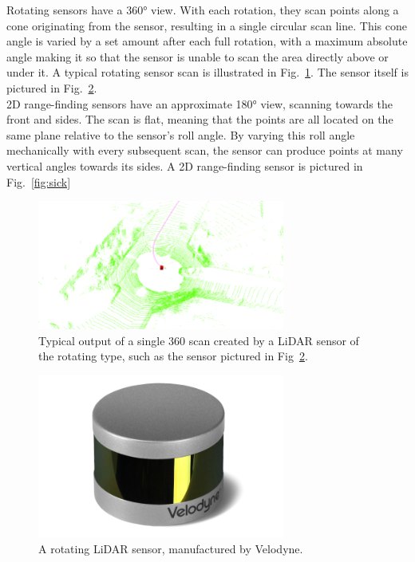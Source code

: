 Rotating sensors have a 360° view. With each rotation, they scan points along a cone originating from the sensor, resulting in a single circular scan line. This cone angle is varied by a set amount after each full rotation, with a maximum absolute angle making it so that the sensor is unable to scan the area directly above or under it. A typical rotating sensor scan is illustrated in Fig.~\ref{fig:velodyne-scan}. The sensor itself is pictured in Fig.~\ref{fig:velodyne}.\\

2D range-finding sensors have an approximate 180° view, scanning towards the front and sides. The scan is flat, meaning that the points are all located on the same plane relative to the sensor’s roll angle. By varying this roll angle mechanically with every subsequent scan, the sensor can produce points at many vertical angles towards its sides. A 2D range-finding sensor is pictured in Fig.~\ref{fig:sick}\\


\begin{figure}
  \centering
  \includegraphics[width=3.2in]{images/1_velodyne_scan.png}
  \caption{Typical output of a single 360 \degree scan created by a LiDAR sensor of the rotating type, such as the sensor pictured in Fig~\ref{fig:velodyne}.}
  \label{fig:velodyne-scan}
\end{figure}

\begin{figure}
  \centering
  \includegraphics[width=3.2in]{images/Velodyne.png}
  \caption{A rotating LiDAR sensor, manufactured by Velodyne.}
  \label{fig:velodyne}
\end{figure}

